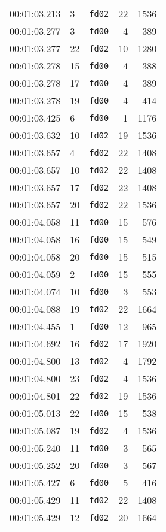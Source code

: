 \documentclass{article}
\begin{document}
\begin{longtable}{lllrr}
00:01:03.213 & 3 & \texttt{fd02} & 22 & 1536 \\
00:01:03.277 & 3 & \texttt{fd00} & 4 & 389 \\
00:01:03.277 & 22 & \texttt{fd02} & 10 & 1280 \\
00:01:03.278 & 15 & \texttt{fd00} & 4 & 388 \\
00:01:03.278 & 17 & \texttt{fd00} & 4 & 389 \\
00:01:03.278 & 19 & \texttt{fd00} & 4 & 414 \\
00:01:03.425 & 6 & \texttt{fd00} & 1 & 1176 \\
00:01:03.632 & 10 & \texttt{fd02} & 19 & 1536 \\
00:01:03.657 & 4 & \texttt{fd02} & 22 & 1408 \\
00:01:03.657 & 10 & \texttt{fd02} & 22 & 1408 \\
00:01:03.657 & 17 & \texttt{fd02} & 22 & 1408 \\
00:01:03.657 & 20 & \texttt{fd02} & 22 & 1536 \\
00:01:04.058 & 11 & \texttt{fd00} & 15 & 576 \\
00:01:04.058 & 16 & \texttt{fd00} & 15 & 549 \\
00:01:04.058 & 20 & \texttt{fd00} & 15 & 515 \\
00:01:04.059 & 2 & \texttt{fd00} & 15 & 555 \\
00:01:04.074 & 10 & \texttt{fd00} & 3 & 553 \\
00:01:04.088 & 19 & \texttt{fd02} & 22 & 1664 \\
00:01:04.455 & 1 & \texttt{fd00} & 12 & 965 \\
00:01:04.692 & 16 & \texttt{fd02} & 17 & 1920 \\
00:01:04.800 & 13 & \texttt{fd02} & 4 & 1792 \\
00:01:04.800 & 23 & \texttt{fd02} & 4 & 1536 \\
00:01:04.801 & 22 & \texttt{fd02} & 19 & 1536 \\
00:01:05.013 & 22 & \texttt{fd00} & 15 & 538 \\
00:01:05.087 & 19 & \texttt{fd02} & 4 & 1536 \\
00:01:05.240 & 11 & \texttt{fd00} & 3 & 565 \\
00:01:05.252 & 20 & \texttt{fd00} & 3 & 567 \\
00:01:05.427 & 6 & \texttt{fd00} & 5 & 416 \\
00:01:05.429 & 11 & \texttt{fd02} & 22 & 1408 \\
00:01:05.429 & 12 & \texttt{fd02} & 20 & 1664 \\

\end{longtable}
\end{document}
